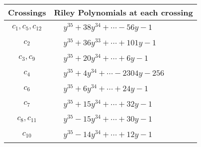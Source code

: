 \documentclass[1p]{elsarticle_modified}
\theoremstyle{definition}
\begin{document}
\begin{tabular}{m{50pt}|m{274pt}}
Crossings & \hspace{64pt}Riley Polynomials at each crossing \\
\hline $$\begin{aligned}c_{1},c_{5},c_{12}\end{aligned}$$&$\begin{aligned}
&y^{35}+38 y^{34}+\cdots-56 y-1
\end{aligned}$\\
\hline $$\begin{aligned}c_{2}\end{aligned}$$&$\begin{aligned}
&y^{35}+36 y^{33}+\cdots+101 y-1
\end{aligned}$\\
\hline $$\begin{aligned}c_{3},c_{9}\end{aligned}$$&$\begin{aligned}
&y^{35}+20 y^{34}+\cdots+6 y-1
\end{aligned}$\\
\hline $$\begin{aligned}c_{4}\end{aligned}$$&$\begin{aligned}
&y^{35}+4 y^{34}+\cdots-2304 y-256
\end{aligned}$\\
\hline $$\begin{aligned}c_{6}\end{aligned}$$&$\begin{aligned}
&y^{35}+6 y^{34}+\cdots+24 y-1
\end{aligned}$\\
\hline $$\begin{aligned}c_{7}\end{aligned}$$&$\begin{aligned}
&y^{35}+15 y^{34}+\cdots+32 y-1
\end{aligned}$\\
\hline $$\begin{aligned}c_{8},c_{11}\end{aligned}$$&$\begin{aligned}
&y^{35}-15 y^{34}+\cdots+30 y-1
\end{aligned}$\\
\hline $$\begin{aligned}c_{10}\end{aligned}$$&$\begin{aligned}
&y^{35}-14 y^{34}+\cdots+12 y-1
\end{aligned}$\\
\hline
\end{tabular}\\~\\
\end{document}
